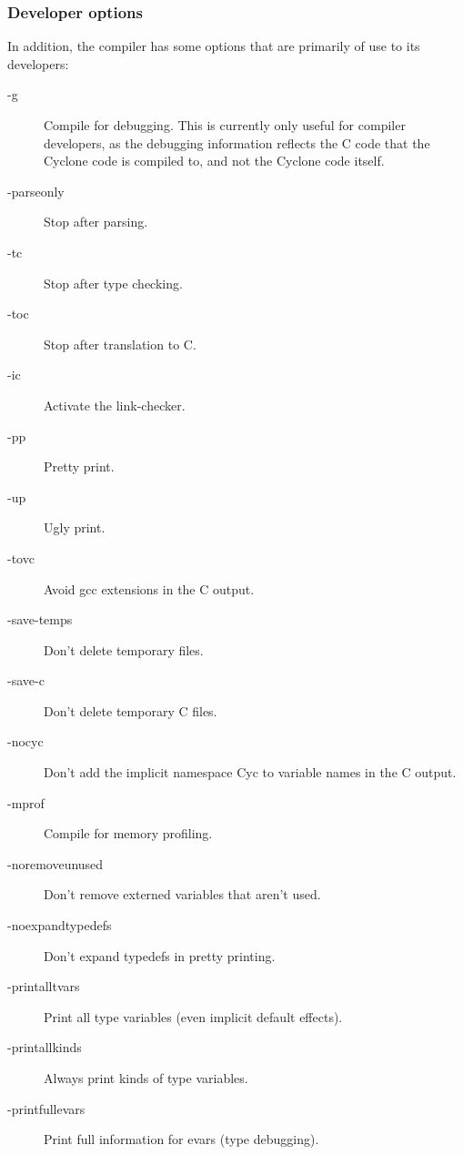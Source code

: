 \subsubsection*{Developer options}

In addition, the compiler has some options that are primarily of use
to its developers:
\begin{description}
\item[-g]
  Compile for debugging.  This is currently only useful for compiler
  developers, as the debugging information reflects the C code that
  the Cyclone code is compiled to, and not the Cyclone code itself.
\item[-parseonly] 
  Stop after parsing.
\item[-tc]
  Stop after type checking.
\item[-toc]
  Stop after translation to C\@.
\item[-ic]
  Activate the link-checker.
\item[-pp]
  Pretty print.
\item[-up]
  Ugly print.
\item[-tovc]
  Avoid gcc extensions in the C output.
\item[-save-temps]
  Don't delete temporary files.
\item[-save-c]
  Don't delete temporary C files.
\item[-nocyc]
  Don't add the implicit namespace Cyc to variable names in the C output.
\item[-mprof]
  Compile for memory profiling.
\item[-noremoveunused] 
  Don't remove externed variables that aren't used.
\item[-noexpandtypedefs] 
  Don't expand typedefs in pretty printing.
\item[-printalltvars] 
  Print all type variables (even implicit default effects).
\item[-printallkinds] 
  Always print kinds of type variables.
\item[-printfullevars] 
  Print full information for evars (type debugging).
\end{description}


